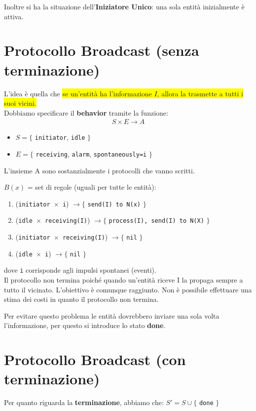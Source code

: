 Inoltre si ha la situazione dell'\textbf{Iniziatore Unico}: una sola entità
inizialmente è attiva.

\section{Protocollo Broadcast (senza terminazione)}
L'idea è quella che \colorbox{yellow}{se un'entità ha l'informazione $I$, allora
    la trasmette a tutti i suoi vicini.} \\ Dobbiamo specificare il
\textbf{behavior} tramite la funzione:
\begin{eqnarray}
    S \times E \rightarrow A
    \nonumber
\end{eqnarray}
\begin{itemize}
    \item $S=\lbrace$ \texttt{initiator}, \texttt{idle} $\rbrace$
    \item $E=\lbrace$ \texttt{receiving}, \texttt{alarm}, \texttt{spontaneously=i}
          $\rbrace$
\end{itemize}

L'insieme A sono sostanzialmente i protocolli che vanno scritti.

$B(x)$ = set di regole (uguali per tutte le entità):
\begin{enumerate}
    \item (\texttt{initiator $\times$ i}) $\rightarrow \lbrace$ \texttt{send(I) to N(x)}
          $\rbrace$
    \item (\texttt{idle $\times$ receiving(I)}) $\rightarrow \lbrace$ \texttt{process(I),
              send(I) to N(X)} $\rbrace$
    \item (\texttt{initiator $\times$ receiving(I)}) $\rightarrow \lbrace$ \texttt{nil}
          $\rbrace$
    \item (\texttt{idle $\times$ i}) $\rightarrow \lbrace$ \texttt{nil} $\rbrace$
\end{enumerate}
dove \texttt{i} corrisponde agli impulsi spontanei (eventi).\\

Il protocollo non termina poiché quando un'entità riceve I la propaga sempre a
tutto il vicinato. L'obiettivo è comunque raggiunto. Non è possibile effettuare
una stima dei costi in quanto il protocollo non termina.

Per evitare questo problema le entità dovrebbero inviare una sola volta
l'informazione, per questo si introduce lo stato \textbf{done}.

\section{Protocollo Broadcast (con terminazione)}
Per quanto riguarda la \textbf{terminazione}, abbiamo che: $S' = S \cup \lbrace$
\texttt{done} $\rbrace$

